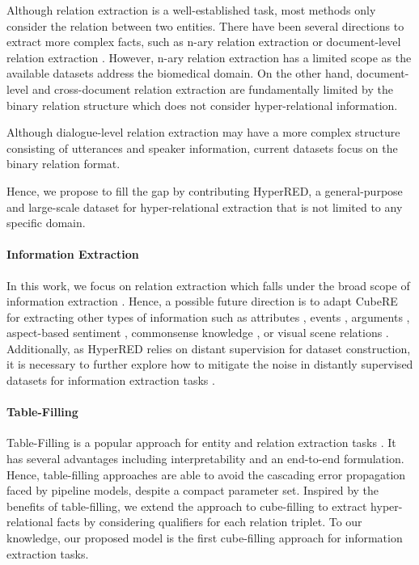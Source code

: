 \documentclass[11pt]{article}
\newcommand{\flag}[1]{#1}
\newcommand{\modelname}{CubeRE}
\newcommand{\dataname}{HyperRED}
\begin{document}
Although relation extraction is a well-established task, most methods only consider the relation between two entities.
There have been several directions to extract more complex facts, such as n-ary relation extraction or document-level relation extraction \citep{yao-etal-2019-docred}.
However, n-ary relation extraction \citep{jia-etal-2019-document, akimoto-etal-2019-cross} has a limited scope as the available datasets address the biomedical domain.
On the other hand, document-level \citep{tan-etal-2022-document} and cross-document relation extraction \citep{yao-etal-2021-codred} are fundamentally limited by the binary relation structure which does not consider hyper-relational information.
\flag{
Although dialogue-level relation extraction \citep{DBLP:journals/corr/abs-2009-05092} may have a more complex structure consisting of utterances and speaker information, current datasets \citep{welleck-etal-2019-dialogue} focus on the binary relation format.
}
Hence, we propose to fill the gap by contributing \dataname{}, a general-purpose and large-scale dataset for hyper-relational extraction that is not limited to any specific domain. 


\paragraph{Information Extraction}
\flag{
In this work, we focus on relation extraction which falls under the broad scope of information extraction \citep{bing-etal-2015-improving}.
Hence, a possible future direction is to adapt \modelname{} for extracting other types of information such as attributes \citep{10.1145/2433396.2433468}, events \citep{wang-etal-2021-cleve}, arguments \citep{cheng-etal-2020-ape, cheng-etal-2022-iam}, aspect-based sentiment \citep{xu-etal-2021-learning, 10.1145/3459637.3482058}, commonsense knowledge \citep{ghosal-etal-2021-cider}, or visual scene relations \citep{DBLP:journals/corr/abs-1909-06273}.
Additionally, as \dataname{} relies on distant supervision for dataset construction, it is necessary to further explore how to mitigate the noise in distantly supervised datasets for information extraction tasks \citep{nayak-etal-2021-improving}.
}

\paragraph{Table-Filling}
Table-Filling is a popular approach for entity and relation extraction tasks \citep{miwa-sasaki-2014-modeling, gupta-etal-2016-table, zhang-etal-2017-position}.
It has several advantages including interpretability and an end-to-end formulation.
Hence, table-filling approaches are able to avoid the cascading error propagation faced by pipeline models, despite a compact parameter set.
Inspired by the benefits of table-filling, we extend the approach to cube-filling to extract hyper-relational facts by considering qualifiers for each relation triplet.
To our knowledge, our proposed model is the first cube-filling approach for information extraction tasks.
\end{document}
